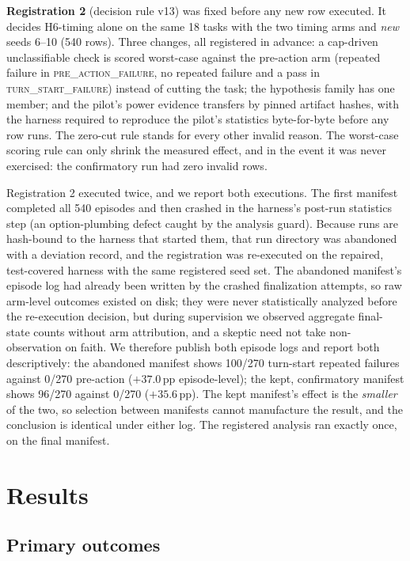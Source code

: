 \documentclass[11pt]{article}
\newcommand{\pp}{\ensuremath{\,\mathrm{pp}}}
\begin{document}
\textbf{Registration 2} (decision rule v13) was fixed before any new row
executed. It decides H6-timing alone on the same 18 tasks with the two timing
arms and \emph{new} seeds 6--10 (540 rows). Three changes, all registered in
advance: a cap-driven unclassifiable check is scored worst-case against the
pre-action arm (repeated failure in \textsc{pre\_action\_failure}, no
repeated failure and a pass in \textsc{turn\_start\_failure}) instead of
cutting the task; the hypothesis family has one member; and the pilot's power
evidence transfers by pinned artifact hashes, with the harness required to
reproduce the pilot's statistics byte-for-byte before any row runs. The
zero-cut rule stands for every other invalid reason. The worst-case scoring
rule can only shrink the measured effect, and in the event it was never
exercised: the confirmatory run had zero invalid rows.

Registration 2 executed twice, and we report both executions. The first
manifest completed all 540 episodes and then crashed in the harness's
post-run statistics step (an option-plumbing defect caught by the analysis
guard). Because runs are hash-bound to the harness that started them, that
run directory was abandoned with a deviation record, and the registration
was re-executed on the repaired, test-covered harness with the same
registered seed set. The abandoned manifest's episode log had already been
written by the crashed finalization attempts, so raw arm-level outcomes
existed on disk; they were never statistically analyzed before the
re-execution decision, but during supervision we observed aggregate
final-state counts without arm attribution, and a skeptic need not take
non-observation on faith. We therefore publish both episode logs and report
both descriptively: the abandoned manifest shows 100/270 turn-start repeated
failures against 0/270 pre-action ($+37.0\pp$ episode-level); the kept,
confirmatory manifest shows 96/270 against 0/270 ($+35.6\pp$). The kept
manifest's effect is the \emph{smaller} of the two, so selection between
manifests cannot manufacture the result, and the conclusion is identical
under either log. The registered analysis ran exactly once, on the final
manifest.

\section{Results}
\label{sec:results}

\subsection{Primary outcomes}
\label{sec:primary}
\end{document}

